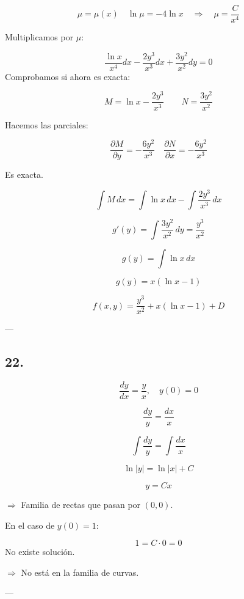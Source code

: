 \documentclass[a4paper,12pt]{article}
\begin{document}
\[
\mu = \mu(x) \quad \ln \mu = -4 \ln x \quad \Rightarrow \quad \mu = \frac{C}{x^4}
\]

Multiplicamos por $\mu$:

\[
\frac{\ln x}{x^4} dx - \frac{2y^3}{x^3} dx + \frac{3y^2}{x^2} dy = 0
\]
Comprobamos si ahora es exacta:

\[
M = \ln x - \frac{2y^3}{x^3} 
\quad\quad 
N = \frac{3y^2}{x^2}
\]

Hacemos las parciales:

\[
\frac{\partial M}{\partial y} = -\frac{6y^2}{x^3} 
\quad 
\frac{\partial N}{\partial x} = -\frac{6y^2}{x^3}
\]

Es exacta.

\[
\int M\, dx = \int \ln x\, dx - \int \frac{2y^3}{x^3}\, dx
\]

\[
g'(y) = \int \frac{3y^2}{x^2}\, dy = \frac{y^3}{x^2}
\]

\[
g(y) = \int \ln x\, dx
\]

\[
g(y) = x (\ln x - 1)
\]

\[
f(x,y) = \frac{y^3}{x^2} + x(\ln x - 1) + D
\]

---

\subsection*{22.}
\[
\frac{dy}{dx} = \frac{y}{x}, \quad y(0) = 0
\]

\[
\frac{dy}{y} = \frac{dx}{x}
\]

\[
\int \frac{dy}{y} = \int \frac{dx}{x}
\]

\[
\ln |y| = \ln |x| + C
\]

\[
y = Cx
\]

$\Rightarrow$ Familia de rectas que pasan por $(0,0)$.

En el caso de $y(0) = 1$:

\[
1 = C \cdot 0 = 0
\]
No existe solución.

$\Rightarrow$ No está en la familia de curvas.

---
\end{document}

